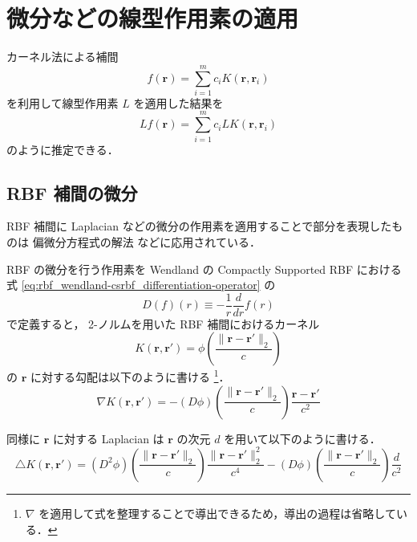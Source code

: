 %

\section{微分などの線型作用素の適用}\label{sec:interp_kernel_operators}

カーネル法による補間
\begin{equation}
    f(\bm{r}) = \sum_{i=1}^m c_i K(\bm{r}, \bm{r}_i)
\end{equation}
を利用して線型作用素 $L$ を適用した結果を
\begin{equation}
    L f(\bm{r}) = \sum_{i=1}^m c_i L K(\bm{r}, \bm{r}_i)
\end{equation}
のように推定できる．

\subsection{RBF 補間の微分}\label{sec:interp_kernel_operators_rbf-differentiation}

RBF 補間に Laplacian などの微分の作用素を適用することで部分を表現したものは
偏微分方程式の解法 \cite{Fornberg2015,Chu2023} などに応用されている．

RBF の微分を行う作用素を Wendland の Compactly Supported RBF における
式 \eqref{eq:rbf_wendland-csrbf_differentiation-operator} の
\begin{equation}
    D(f)(r) \equiv -\frac{1}{r} \frac{d}{dr} f(r)
\end{equation}
で定義すると，
2-ノルムを用いた RBF 補間におけるカーネル
\begin{equation}
    K(\bm{r}, \bm{r}') = \phi\left(\frac{\|\bm{r} - \bm{r}'\|_2}{c}\right)
\end{equation}
の $\bm{r}$ に対する勾配は以下のように書ける
\footnote{$\nabla$ を適用して式を整理することで導出できるため，導出の過程は省略している．}．
\begin{equation}
    \nabla K(\bm{r}, \bm{r}') =
    - (D \phi)\left(\frac{\|\bm{r} - \bm{r}'\|_2}{c}\right) \frac{\bm{r} - \bm{r}'}{c^2}
\end{equation}

同様に $\bm{r}$ に対する Laplacian は $\bm{r}$ の次元 $d$ を用いて以下のように書ける．
\begin{equation}
    \triangle K(\bm{r}, \bm{r}') =
    (D^2 \phi)\left(\frac{\|\bm{r} - \bm{r}'\|_2}{c}\right) \frac{\|\bm{r} - \bm{r}'\|_2^2}{c^4}
    -(D \phi)\left(\frac{\|\bm{r} - \bm{r}'\|_2}{c}\right) \frac{d}{c^2}
\end{equation}

